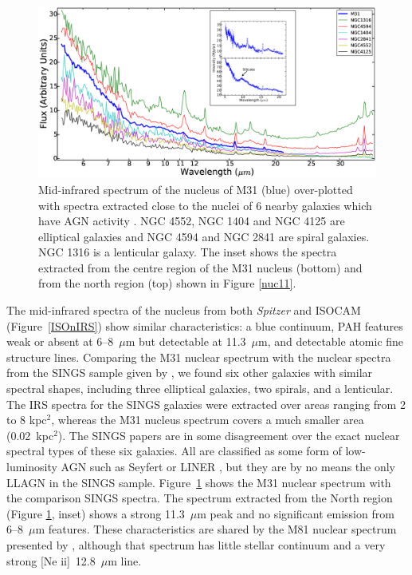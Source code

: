 \begin{figure}
\centering
\includegraphics[height = 8 cm]{./SINGSspec.eps}
\caption{Mid-infrared spectrum of the nucleus of M31 (blue) over-plotted with spectra extracted close to the nuclei of 6 nearby galaxies which have 
AGN activity \citep{Smith:2007lr}. NGC 4552, NGC 1404 and NGC 4125 are elliptical galaxies and NGC 4594 and NGC 2841 are spiral galaxies. 
NGC 1316 is a lenticular galaxy. The inset shows the spectra extracted from the centre region of the M31 nucleus (bottom) and from the north region (top) 
shown in Figure \ref{nuc11}.}
\label{smithspec}
\end{figure}

The mid-infrared spectra of the nucleus from both {\em Spitzer} and ISOCAM (Figure~\ref{ISOnIRS}) show similar characteristics: a blue
continuum, PAH features weak or absent at 6--8~$\mu$m  but detectable at 11.3~$\mu$m, and detectable atomic fine structure lines.
Comparing the M31 nuclear spectrum with the nuclear spectra from the SINGS sample given by \citet{Smith:2007lr}, we found
six other galaxies with similar spectral shapes, including three elliptical galaxies, two spirals, and a lenticular.
The IRS spectra for the SINGS galaxies were extracted over areas ranging from 2 to 8 kpc$^2$, whereas the M31
nucleus spectrum covers a much smaller area (0.02~kpc$^2$).
The SINGS papers \citep{kennicutt03,Smith:2007lr, moustakas2010} are in some disagreement over the
exact nuclear spectral types of these six galaxies. All are classified as some form of low-luminosity AGN
such as Seyfert or LINER \citep[luminous AGN were intentionally omitted from the SINGS sample][]{kennicutt03}, but they are
by no means the only LLAGN in the SINGS sample.
Figure~\ref{smithspec} shows the M31 nuclear spectrum with the comparison SINGS spectra.
The spectrum extracted  from the North region (Figure \ref{smithspec}, inset) shows a strong 11.3~$\mu$m peak 
and no significant emission from 6--8~$\mu$m features. These characteristics are shared by
the M81 nuclear spectrum presented by \citet{Smith2010}, although that spectrum has little stellar continuum and a very strong [Ne {\sc ii}]~12.8~$\mu$m line. 


